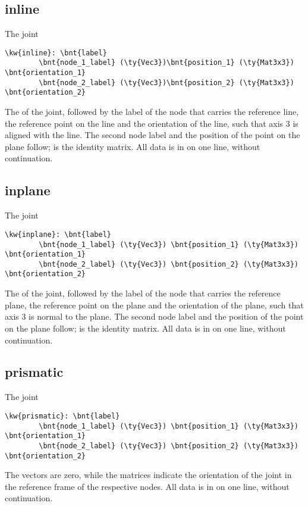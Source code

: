 \subsection{inline}
The  joint
\begin{Verbatim}[commandchars=\\\{\}]
    \kw{inline}: \bnt{label}
        \bnt{node_1_label} (\ty{Vec3})\bnt{position_1} (\ty{Mat3x3}) \bnt{orientation_1}
        \bnt{node_2_label} (\ty{Vec3})\bnt{position_2} (\ty{Mat3x3}) \bnt{orientation_2}
\end{Verbatim}
The  of the joint, followed by the label of the node
that carries the reference line, the reference point 
on the line and the orientation  of the line,
such that axis 3 is aligned with the line.
The second node label and the position of the point on the plane
follow;  is the identity matrix.
All data is in on one line, without continuation.

\subsection{inplane}
The  joint
\begin{Verbatim}[commandchars=\\\{\}]
    \kw{inplane}: \bnt{label}
        \bnt{node_1_label} (\ty{Vec3}) \bnt{position_1} (\ty{Mat3x3}) \bnt{orientation_1}
        \bnt{node_2_label} (\ty{Vec3}) \bnt{position_2} (\ty{Mat3x3}) \bnt{orientation_2}
\end{Verbatim}
The  of the joint, followed by the label of the node
that carries the reference plane, the reference point 
on the plane and the orientation  of the plane,
such that axis 3 is normal to the plane.
The second node label and the position of the point on the plane
follow;  is the identity matrix.
All data is in on one line, without continuation.

\subsection{prismatic}
The  joint
\begin{Verbatim}[commandchars=\\\{\}]
    \kw{prismatic}: \bnt{label}
        \bnt{node_1_label} (\ty{Vec3}) \bnt{position_1} (\ty{Mat3x3}) \bnt{orientation_1}
        \bnt{node_2_label} (\ty{Vec3}) \bnt{position_2} (\ty{Mat3x3}) \bnt{orientation_2}
\end{Verbatim}
The  vectors are zero,
while the  matrices indicate the orientation 
of the joint in the reference frame of the respective nodes.
All data is in on one line, without continuation.

